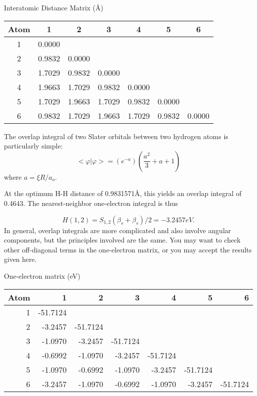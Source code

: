 \begin{center}
Interatomic Distance Matrix (\AA) \nopagebreak\\
\begin{tabular}{ccccccc} \hline
 Atom &   1    &  2   &   3    &  4    &  5  &    6 \\ \hline
   1  &  0.0000& \\
   2  &  0.9832& 0.0000 \\
   3  &  1.7029& 0.9832& 0.0000 \\
   4  &  1.9663& 1.7029& 0.9832& 0.0000 \\
   5  &  1.7029& 1.9663& 1.7029& 0.9832& 0.0000 \\
   6  &  0.9832& 1.7029& 1.9663& 1.7029& 0.9832& 0.0000 \\ \hline
\end{tabular}
\end{center}

The overlap integral of two Slater orbitals between two
hydrogen atoms is particularly simple:
$$
<\varphi|\varphi> = (e^{-a})(\frac{a^2}{3}+a+1)
$$
where $a=\xi R/a_o$.

 At the optimum H-H distance of 0.9831571\AA, this yields
an overlap integral of 0.4643. The nearest-neighbor
one-electron integral is thus

$$
H(1,2) = S_{1,2}(\beta_s + \beta_s)/2 = -3.2457 eV.
$$
In general, overlap integrals are more complicated and also
involve angular components, but the principles involved are
the same. You may want to check other off-diagonal terms in
the one-electron matrix, or you may accept the results given
here.

\begin{center}
One-electron matrix (eV) \nopagebreak \\
\begin{tabular}{rrrrrrr} \hline
 Atom & 1 & 2 & 3 & 4 & 5 & 6 \\ \hline
 1 & -51.7124 \\
 2 &  -3.2457& -51.7124 \\
 3 & -1.0970& -3.2457& -51.7124 \\
 4 & -0.6992& -1.0970& -3.2457& -51.7124 \\
 5 & -1.0970& -0.6992& -1.0970& -3.2457& -51.7124 \\
 6& -3.2457& -1.0970& -0.6992& -1.0970& -3.2457& -51.7124 \\ \hline
\end{tabular}
\end{center}

